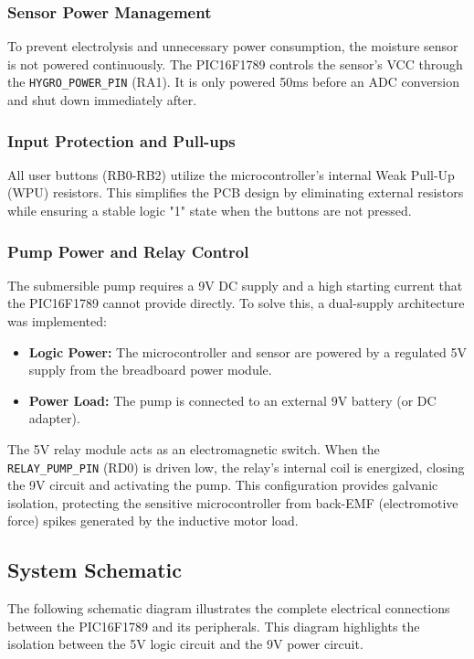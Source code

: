 \subsubsection{Sensor Power Management}
To prevent electrolysis and unnecessary power consumption, the moisture sensor is not powered continuously. The PIC16F1789 controls the sensor's VCC through the \texttt{HYGRO\_POWER\_PIN} (RA1). It is only powered 50ms before an ADC conversion and shut down immediately after.

\subsubsection{Input Protection and Pull-ups}
All user buttons (RB0-RB2) utilize the microcontroller's internal Weak Pull-Up (WPU) resistors. This simplifies the PCB design by eliminating external resistors while ensuring a stable logic "1" state when the buttons are not pressed.

\subsubsection{Pump Power and Relay Control}
The submersible pump requires a 9V DC supply and a high starting current that the PIC16F1789 cannot provide directly. To solve this, a dual-supply architecture was implemented:
\begin{itemize}
    \item \textbf{Logic Power:} The microcontroller and sensor are powered by a regulated 5V supply from the breadboard power module.
    \item \textbf{Power Load:} The pump is connected to an external 9V battery (or DC adapter).
\end{itemize}
The 5V relay module acts as an electromagnetic switch. When the \texttt{RELAY\_PUMP\_PIN} (RD0) is driven low, the relay's internal coil is energized, closing the 9V circuit and activating the pump. This configuration provides galvanic isolation, protecting the sensitive microcontroller from back-EMF (electromotive force) spikes generated by the inductive motor load.
\subsection{System Schematic}
The following schematic diagram illustrates the complete electrical connections between the PIC16F1789 and its peripherals. This diagram highlights the isolation between the 5V logic circuit and the 9V power circuit.

